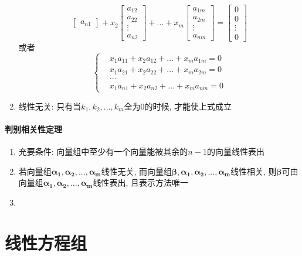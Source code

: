 \begin{enumerate}
\begin{equation*}
\begin{bmatrix}
a_{n1}
\end{bmatrix}+
x_{2}\begin{bmatrix}
a_{12} \\
a_{22} \\
\vdots \\
a_{n2}
\end{bmatrix}+...+
x_{m}\begin{bmatrix}
a_{1m} \\
a_{2m} \\
\vdots \\
a_{nm}
\end{bmatrix}=
\begin{bmatrix}
0 \\
0 \\
\vdots \\
0
\end{bmatrix}
\end{equation*}
或者
\begin{equation*}
\left\{\begin{aligned}
& x_{1}a_{11}+x_{2}a_{12}+...+x_{m}a_{1m}=0 \\
& x_{1}a_{21}+x_{2}a_{22}+...+x_{m}a_{2m}=0 \\
& \dots \\
& x_{1}a_{n1}+x_{2}a_{n2}+...+x_{m}a_{nm}=0
\end{aligned}
\right.
\end{equation*}
\item 线性无关: 只有当$ k_{1},k_{2},...,k_{m} $全为$ 0 $的时候, 才能使上式成立
\end{enumerate}
\subsubsection{判别相关性定理}
\begin{enumerate}
\item 充要条件: 向量组中至少有一个向量能被其余的$ n-1 $的向量线性表出
\item 若向量组$ \bm{\alpha_{1}},\bm{\alpha_{2}},...,\bm{\alpha_{m}} $线性无关, 而向量组$ \bm{\beta}, \bm{\alpha_{1}},\bm{\alpha_{2}},...,\bm{\alpha_{m}} $线性相关, 则$ \bm{\beta} $可由向量组$ \bm{\alpha_{1}},\bm{\alpha_{2}},...,\bm{\alpha_{m}} $线性表出, 且表示方法唯一
\item 
\end{enumerate}


\chapter{线性方程组}

